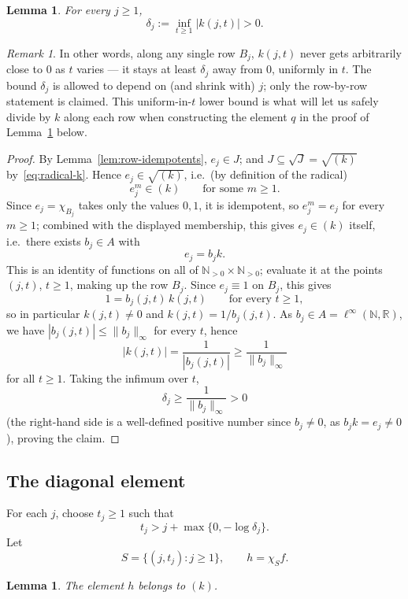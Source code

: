 \documentclass{amsart}
\newtheorem{lemma}[theorem]{Lemma}
\theoremstyle{definition}
\theoremstyle{remark}
\newtheorem{remark}[theorem]{Remark}
\newcommand{\nat}{\mathbb N}
\newcommand{\reals}{\mathbb R}
\newcommand{\linfty}{\ell^\infty}
\begin{document}
\begin{lemma}\label{lem:row-lower-bound}
For every $j\geq1$,
\[
\delta_j:=\inf_{t\geq1}|k(j,t)|>0.
\]
\end{lemma}

\begin{remark}
In other words, along any single row $B_j$, $k(j,t)$ never gets
arbitrarily close to $0$ as $t$ varies --- it stays at least $\delta_j$
away from $0$, uniformly in $t$. The bound $\delta_j$ is allowed to
depend on (and shrink with) $j$; only the row-by-row statement is
claimed. This uniform-in-$t$ lower bound is what will let us safely
divide by $k$ along each row when constructing the element $q$ in the
proof of Lemma~\ref{lem:h-in-k} below.
\end{remark}

\begin{proof}
By Lemma~\ref{lem:row-idempotents}, $e_j\in J$; and $J\subseteq\sqrt
J=\sqrt{(k)}$ by~\eqref{eq:radical-k}.
Hence $e_j\in\sqrt{(k)}$, i.e.\ (by definition of the radical)
\[
e_j^m\in(k)\qquad\text{for some }m\geq1.
\]
Since $e_j=\chi_{B_j}$ takes only the values $0,1$, it is idempotent,
so $e_j^m=e_j$ for every $m\geq1$; combined with the displayed
membership, this gives $e_j\in(k)$ itself, i.e.\ there exists $b_j\in A$
with
\[
e_j=b_jk.
\]
This is an identity of functions on all of $\nat_{>0}\times\nat_{>0}$;
evaluate it at the points $(j,t)$, $t\geq1$, making up the row $B_j$.
Since $e_j\equiv1$ on $B_j$, this gives
\[
1=b_j(j,t)\,k(j,t)\qquad\text{for every }t\geq1,
\]
so in particular $k(j,t)\neq0$ and $k(j,t)=1/b_j(j,t)$. As
$b_j\in A=\linfty(\nat,\reals)$, we have $|b_j(j,t)|\leq\|b_j\|_\infty$
for every $t$, hence
\[
|k(j,t)|=\frac{1}{|b_j(j,t)|}\geq\frac{1}{\|b_j\|_\infty}
\]
for all $t\geq1$. Taking the infimum over $t$,
\[
\delta_j\geq\frac{1}{\|b_j\|_\infty}>0
\]
(the right-hand side is a well-defined positive number since $b_j\neq0$,
as $b_jk=e_j\neq0$), proving the claim.
\end{proof}

\subsection{The diagonal element}

For each $j$, choose $t_j\geq1$ such that
\[
t_j>j+\max\{0,-\log\delta_j\}.
\]
Let
\[
S=\{(j,t_j):j\geq1\},
\qquad
h=\chi_Sf.
\]

\begin{lemma}\label{lem:h-in-k}
The element $h$ belongs to $(k)$.
\end{lemma}
\end{document}
